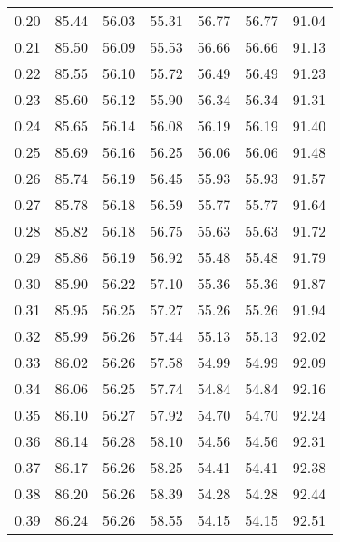 \begin{tabular}{|c|c|c|c|c|c|c|}
      0.20 &     85.44 &     56.03 &      55.31 &   56.77 &      56.77 &         91.04 \\
      0.21 &     85.50 &     56.09 &      55.53 &   56.66 &      56.66 &         91.13 \\
      0.22 &     85.55 &     56.10 &      55.72 &   56.49 &      56.49 &         91.23 \\
      0.23 &     85.60 &     56.12 &      55.90 &   56.34 &      56.34 &         91.31 \\
      0.24 &     85.65 &     56.14 &      56.08 &   56.19 &      56.19 &         91.40 \\
      0.25 &     85.69 &     56.16 &      56.25 &   56.06 &      56.06 &         91.48 \\
      0.26 &     85.74 &     56.19 &      56.45 &   55.93 &      55.93 &         91.57 \\
      0.27 &     85.78 &     56.18 &      56.59 &   55.77 &      55.77 &         91.64 \\
      0.28 &     85.82 &     56.18 &      56.75 &   55.63 &      55.63 &         91.72 \\
      0.29 &     85.86 &     56.19 &      56.92 &   55.48 &      55.48 &         91.79 \\
      0.30 &     85.90 &     56.22 &      57.10 &   55.36 &      55.36 &         91.87 \\
      0.31 &     85.95 &     56.25 &      57.27 &   55.26 &      55.26 &         91.94 \\
      0.32 &     85.99 &     56.26 &      57.44 &   55.13 &      55.13 &         92.02 \\
      0.33 &     86.02 &     56.26 &      57.58 &   54.99 &      54.99 &         92.09 \\
      0.34 &     86.06 &     56.25 &      57.74 &   54.84 &      54.84 &         92.16 \\
      0.35 &     86.10 &     56.27 &      57.92 &   54.70 &      54.70 &         92.24 \\
      0.36 &     86.14 &     56.28 &      58.10 &   54.56 &      54.56 &         92.31 \\
      0.37 &     86.17 &     56.26 &      58.25 &   54.41 &      54.41 &         92.38 \\
      0.38 &     86.20 &     56.26 &      58.39 &   54.28 &      54.28 &         92.44 \\
      0.39 &     86.24 &     56.26 &      58.55 &   54.15 &      54.15 &         92.51 \\

\end{tabular}
